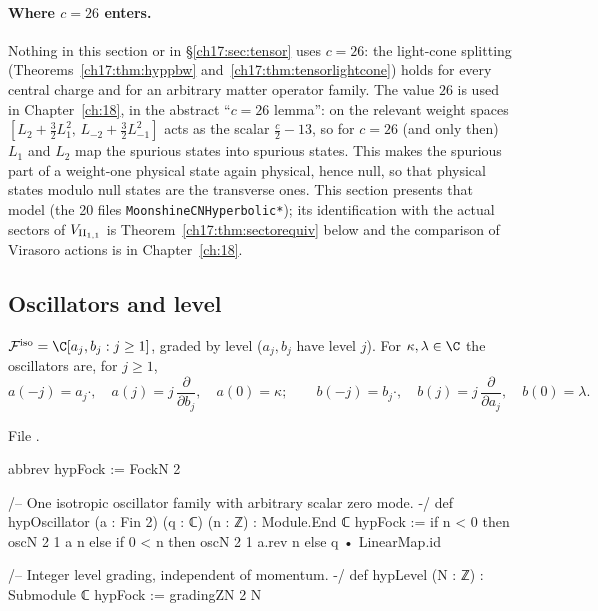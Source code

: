 \paragraph{Where $c=26$ enters.}  Nothing in this section or in \S\ref{ch17:sec:tensor} uses $c=26$: the light-cone
splitting (Theorems~\ref{ch17:thm:hyppbw} and~\ref{ch17:thm:tensorlightcone}) holds for every central charge and for an
arbitrary matter operator family.  The value $26$ is used in Chapter~\ref{ch:18}, in the abstract ``$c=26$ lemma'': on the relevant
weight spaces $[L_2+\tfrac32L_1^2,\,L_{-2}+\tfrac32L_{-1}^2]$ acts as the scalar $\tfrac c2-13$, so for $c=26$ (and only then)
$L_1$ and $L_2$ map the spurious states into spurious states.  This makes the spurious part of a weight-one physical
state again physical, hence null, so that physical states modulo null states are the transverse ones.  This section presents that model (the 20 files
\texttt{MoonshineCNHyperbolic*}); its identification with the actual sectors of ${V_{\mathrm{II}_{1,1}}}$ is
Theorem~\ref{ch17:thm:sectorequiv} below and the comparison of Virasoro actions is in Chapter~\ref{ch:18}.

\subsection{Oscillators and level}

\begin{definition}\label{ch17:def:hypfock}
$\chseventeenF^{\mathrm{iso}}=\C[a_j,b_j:j\ge1]$, graded by level ($a_j,b_j$ have level $j$).  For $\kappa,\lambda\in\C$ the
oscillators are, for $j\ge1$,
\begin{equation*}
  a(-j)=a_j\cdot,\quad a(j)=j\,\frac{\partial}{\partial b_j},\quad a(0)=\kappa;\qquad
  b(-j)=b_j\cdot,\quad b(j)=j\,\frac{\partial}{\partial a_j},\quad b(0)=\lambda .
\end{equation*}
\end{definition}

\noindent File .
\begin{leancode}
abbrev hypFock := FockN 2

/-- One isotropic oscillator family with arbitrary scalar zero mode. -/
def hypOscillator (a : Fin 2) (q : ℂ) (n : ℤ) : Module.End ℂ hypFock :=
  if n < 0 then oscN 2 1 a n
  else if 0 < n then oscN 2 1 a.rev n
  else q • LinearMap.id

/-- Integer level grading, independent of momentum. -/
def hypLevel (N : ℤ) : Submodule ℂ hypFock := gradingZN 2 N
\end{leancode}


